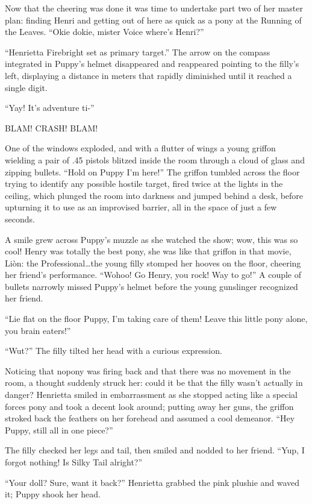 Now that the cheering was done it was time to undertake part two of her master plan: finding Henri and getting out of here as quick as a pony at the Running of the Leaves. ``Okie dokie, mister Voice where's Henri?''

``Henrietta Firebright set as primary target.'' The arrow on the compass integrated in Puppy's helmet disappeared and reappeared pointing to the filly's left, displaying a distance in meters that rapidly diminished until it reached a single digit.

``Yay! It's adventure ti-''

BLAM! CRASH! BLAM!

One of the windows exploded, and with a flutter of wings a young griffon wielding a pair of .45 pistols blitzed inside the room through a cloud of glass and zipping bullets. ``Hold on Puppy I'm here!'' The griffon tumbled across the floor trying to identify any possible hostile target, fired twice at the lights in the ceiling, which plunged the room into darkness and jumped behind a desk, before upturning it to use as an improvised barrier, all in the space of just a few seconds.

A smile grew across Puppy's muzzle as she watched the show; wow, this was so cool! Henry was totally the best pony, she was like that griffon in that movie, Liòn: the Professional\dots the young filly stomped her hooves on the floor, cheering her friend's performance. ``Wohoo! Go Henry, you rock! Way to go!'' A couple of bullets narrowly missed Puppy's helmet before the young gunslinger recognized her friend.

``Lie flat on the floor Puppy, I'm taking care of them! Leave this little pony alone, you brain eaters!''

``Wut?'' The filly tilted her head with a curious expression.

Noticing that nopony was firing back and that there was no movement in the room, a thought suddenly struck her: could it be that the filly wasn't actually in danger? Henrietta smiled in embarrassment as she stopped acting like a special forces pony and took a decent look around; putting away her guns, the griffon stroked back the feathers on her forehead and assumed a cool demeanor. ``Hey Puppy, still all in one piece?''

The filly checked her legs and tail, then smiled and nodded to her friend. ``Yup, I forgot nothing! Is Silky Tail alright?''

``Your doll? Sure, want it back?'' Henrietta grabbed the pink plushie and waved it; Puppy shook her head.

